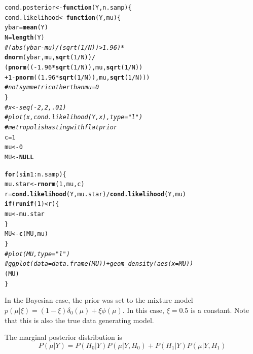 \documentclass[AMA,STIX1COL]{WileyNJD-v2}\usepackage[]{graphicx}\usepackage[]{color}
\makeatletter
\newcommand{\hlnum}[1]{\textcolor[rgb]{0.686,0.059,0.569}{#1}}%
\newcommand{\hlcom}[1]{\textcolor[rgb]{0.678,0.584,0.686}{\textit{#1}}}%
\newcommand{\hlopt}[1]{\textcolor[rgb]{0,0,0}{#1}}%
\newcommand{\hlstd}[1]{\textcolor[rgb]{0.345,0.345,0.345}{#1}}%
\newcommand{\hlkwa}[1]{\textcolor[rgb]{0.161,0.373,0.58}{\textbf{#1}}}%
\newcommand{\hlkwb}[1]{\textcolor[rgb]{0.69,0.353,0.396}{#1}}%
\newcommand{\hlkwc}[1]{\textcolor[rgb]{0.333,0.667,0.333}{#1}}%
\newcommand{\hlkwd}[1]{\textcolor[rgb]{0.737,0.353,0.396}{\textbf{#1}}}%
\newenvironment{kframe}{%
 \def\at@end@of@kframe{}%
 \ifinner\ifhmode%
  \def\at@end@of@kframe{\end{minipage}}%
  \begin{minipage}{\columnwidth}%
 \fi\fi%
 \def\FrameCommand##1{\hskip\@totalleftmargin \hskip-\fboxsep
 \colorbox{shadecolor}{##1}\hskip-\fboxsep
     \hskip-\linewidth \hskip-\@totalleftmargin \hskip\columnwidth}%
 \MakeFramed {\advance\hsize-\width
   \@totalleftmargin\z@ \linewidth\hsize
   \@setminipage}}%
 {\par\unskip\endMakeFramed%
 \at@end@of@kframe}
\newenvironment{knitrout}{}{} %
\makeatother
\begin{document}
\begin{knitrout}
\color{fgcolor}\begin{kframe}
\begin{alltt}
\hlstd{cond.posterior}\hlkwb{<-} \hlkwa{function}\hlstd{(}\hlkwc{Y}\hlstd{,} \hlkwc{n.samp}\hlstd{)\{}
  \hlstd{cond.likelihood}\hlkwb{<-} \hlkwa{function}\hlstd{(}\hlkwc{Y}\hlstd{,} \hlkwc{mu}\hlstd{)\{}
    \hlstd{ybar} \hlkwb{=} \hlkwd{mean}\hlstd{(Y)}
    \hlstd{N} \hlkwb{=} \hlkwd{length}\hlstd{(Y)}
    \hlcom{#(abs(ybar-mu)/(sqrt(1/N))>1.96)*}
    \hlkwd{dnorm}\hlstd{(ybar, mu,} \hlkwd{sqrt}\hlstd{(}\hlnum{1}\hlopt{/}\hlstd{N))}\hlopt{/}
      \hlstd{(}\hlkwd{pnorm}\hlstd{((}\hlopt{-}\hlnum{1.96}\hlopt{*}\hlkwd{sqrt}\hlstd{(}\hlnum{1}\hlopt{/}\hlstd{N)), mu,} \hlkwd{sqrt}\hlstd{(}\hlnum{1}\hlopt{/}\hlstd{N))}
       \hlopt{+}\hlnum{1}\hlopt{-}\hlkwd{pnorm}\hlstd{((}\hlnum{1.96}\hlopt{*}\hlkwd{sqrt}\hlstd{(}\hlnum{1}\hlopt{/}\hlstd{N)), mu,} \hlkwd{sqrt}\hlstd{(}\hlnum{1}\hlopt{/}\hlstd{N)))}
    \hlcom{#not symmetric other than mu = 0}
  \hlstd{\}}
  \hlcom{#x<- seq(-2,2,.01)}
  \hlcom{#plot(x, cond.likelihood(Y, x), type="l")}
  \hlcom{#metropolis hasting with flat prior}
  \hlstd{c}\hlkwb{=}\hlnum{1}
  \hlstd{mu} \hlkwb{<-} \hlnum{0}
  \hlstd{MU} \hlkwb{<-} \hlkwa{NULL}

  \hlkwa{for}\hlstd{(s} \hlkwa{in} \hlnum{1}\hlopt{:}\hlstd{n.samp)\{}
    \hlstd{mu.star} \hlkwb{<-} \hlkwd{rnorm}\hlstd{(}\hlnum{1}\hlstd{, mu, c)}
    \hlstd{r} \hlkwb{=} \hlkwd{cond.likelihood}\hlstd{(Y,mu.star)}\hlopt{/}\hlkwd{cond.likelihood}\hlstd{(Y,mu)}
    \hlkwa{if}\hlstd{(}\hlkwd{runif}\hlstd{(}\hlnum{1}\hlstd{)}\hlopt{<}\hlstd{r)\{}
      \hlstd{mu} \hlkwb{<-} \hlstd{mu.star}
    \hlstd{\}}
    \hlstd{MU} \hlkwb{<-} \hlkwd{c}\hlstd{(MU, mu)}
  \hlstd{\}}
  \hlcom{#plot(MU, type="l")}
  \hlcom{#ggplot(data = data.frame(MU))+geom_density(aes(x=MU))}
  \hlstd{(MU)}
\hlstd{\}}
\end{alltt}
\end{kframe}
\end{knitrout}


In the Bayesian case, the prior was set to the mixture model $p(\mu|\xi) = (1-\xi ) \delta_0(\mu)+ \xi\phi(\mu)$. In this case, $\xi = 0.5$ is a constant. Note that this is also the true data generating model. 

The marginal posterior distribution is 
\begin{equation}
P(\mu | Y ) = P(H_0|Y)P(\mu|Y, H_0) + P(H_1|Y)P(\mu|Y, H_1)
\end{equation}
\end{document}
